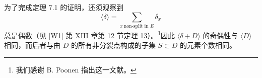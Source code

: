 \documentclass[11pt,a4paper]{article}
\begin{document}
为了完成定理 7.1 的证明，还须观察到
\[
\langle\delta\rangle = \sum_{x\ \text{non-split in }E}\delta_x
\]
总是偶数（见 [W1] 第 XIII 章第 12 节定理 13）。\footnote{我们感谢 B. Poonen 指出这一文献。}因此 $\langle\delta+D\rangle$ 的奇偶性与 $\langle D\rangle$ 相同，而后者与由 $D$ 的所有非分裂点构成的子集 $S\subset D$ 的元素个数相同。



\end{document}

